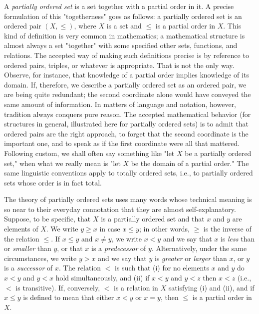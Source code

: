 A \textit{partially ordered set} is a set together with a partial order in it. A precise formulation of this "togetherness" goes as follows: a partially ordered set is an ordered pair $(X, \le )$, where $X$ is a set and $\le$ is a partial order in $X$. This kind of definition is very common in mathematics; a mathematical structure is almost always a set "together" with some specified other sets, functions, and relations. The accepted way of making such definitions precise is by reference to ordered pairs, triples, or whatever is appropriate. That is not the only way. Observe, for instance, that knowledge of a partial order implies knowledge of its domain. If, therefore, we describe a partially ordered set as an ordered pair, we are being quite redundant; the second coordinate alone would have conveyed the same amount of information. In matters of language and notation, however, tradition always conquers pure reason. The accepted mathematical behavior (for structures in general, illustrated here for partially ordered sets) is to admit that ordered pairs are the right approach, to forget that the second coordinate is the important one, and to speak as if the first coordinate were all that mattered. Following custom, we shall often say something like "let $X$ be a partially ordered set," when what we really mean is "let $X$ be the domain of a partial order." The same linguistic conventions apply to totally ordered sets, i.e., to partially ordered sets whose order is in fact total. 

The theory of partially ordered sets uses many words whose technical meaning is so near to their everyday connotation that they are almost self-explanatory. Suppose, to be specific, that $X$ is a partially ordered set and that $x$ and $y$ are elements of $X$. We write $y \ge x$ in case $x \le y$; in other words, $\ge$ is the inverse of the relation $\le$. If $x \le y$ and $x \neq y$, we write $x < y$ and we say that $x$ is \textit{less} than or \textit{smaller} than $y$, or that $x$ is a \textit{predecessor} of $y$. Alternatively, under the same circumstances, we write $y > x$ and we say that $y$ is \textit{greater} or \textit{larger} than $x$, or $y$ is a \textit{successor} of $x$. The relation $<$ is such that (i) for no elements $x$ and $y$ do $x < y$ and $y < x$ hold simultaneously, and (ii) if $x < y$ and $y < z$ then $x < z$ (i.e., $<$ is transitive). If, conversely, $<$ is a relation in $X$ satisfying (i) and (ii), and if $x \le y$ is defined to mean that either $x < y$ or $x = y$, then $\le$ is a partial order in $X$. 

